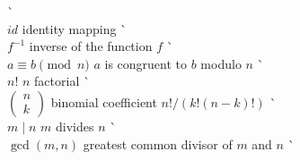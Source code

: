 \begin{tabbing}
     \` \pageref{ncartesian} \\
$id$ \> identity mapping \> \` \pageref{noteidentity} \\
$f^{-1}$ \> inverse of the function $f$	\> \` \pageref{inversefunc} \\
$a \equiv b \pmod{n}$ \> $a$ is congruent to $b$ modulo $n$ \> 
     \` \pageref{amodb} \\
$n!$ \> $n$ factorial \> \` \pageref{factorial} \\
$\left(\begin{array}{c}n \\ k \end{array} \right)$ \> binomial
     coefficient $n!/(k! (n-k)!)$ \> \` \pageref{binomial} \\
$m \mid n$ \> $m$ divides $n$ \> \` \pageref{divides} \\
$\gcd(m, n)$ \> greatest common divisor of $m$ and $n$ \>
     \` \pageref{greatestcd}
\end{tabbing} \clearpage
